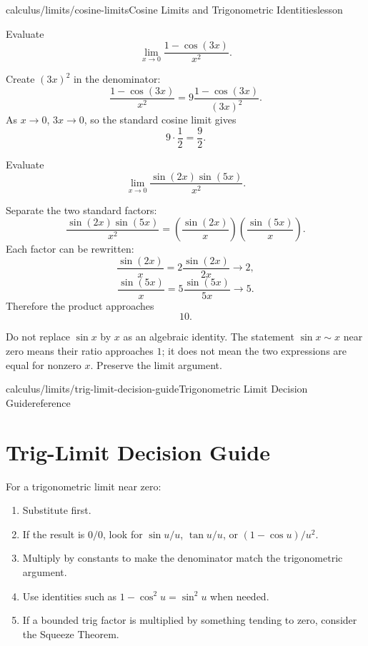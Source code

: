 \begin{webpage}{calculus/limits/cosine-limits}{Cosine Limits and Trigonometric Identities}{lesson}
\begin{bgexample}[title={Identity plus a standard limit}]
Evaluate
\[
  \lim_{x\to0}\frac{1-\cos(3x)}{x^2}.
\]

\begin{bgsolution}
Create \((3x)^2\) in the denominator:
\[
  \frac{1-\cos(3x)}{x^2}
  =9\frac{1-\cos(3x)}{(3x)^2}.
\]
As \(x\to0\), \(3x\to0\), so the standard cosine limit gives
\[
  9\cdot\frac12=\boxed{\frac92}.
\]
\end{bgsolution}
\end{bgexample}

\begin{bgexample}[title={Exam-level: use an identity before the standard limit}]
Evaluate
\[
  \lim_{x\to0}\frac{\sin(2x)\sin(5x)}{x^2}.
\]

\begin{bgsolution}
Separate the two standard factors:
\[
\frac{\sin(2x)\sin(5x)}{x^2}
=\left(\frac{\sin(2x)}{x}\right)
 \left(\frac{\sin(5x)}{x}\right).
\]
Each factor can be rewritten:
\[
  \frac{\sin(2x)}{x}=2\frac{\sin(2x)}{2x}\to2,
\]
\[
  \frac{\sin(5x)}{x}=5\frac{\sin(5x)}{5x}\to5.
\]
Therefore the product approaches
\[
  \boxed{10}.
\]
\end{bgsolution}
\end{bgexample}

\begin{bgexamnote}
Do not replace \(\sin x\) by \(x\) as an algebraic identity. The statement \(\sin x\sim x\) near zero means their ratio approaches \(1\); it does not mean the two expressions are equal for nonzero \(x\). Preserve the limit argument.
\end{bgexamnote}
\end{webpage}

\begin{webpage}{calculus/limits/trig-limit-decision-guide}{Trigonometric Limit Decision Guide}{reference}
\section{Trig-Limit Decision Guide}

\begin{bgmethod}
For a trigonometric limit near zero:
\begin{enumerate}
  \item Substitute first.
  \item If the result is \(0/0\), look for \(\sin u/u\), \(\tan u/u\), or \((1-\cos u)/u^2\).
  \item Multiply by constants to make the denominator match the trigonometric argument.
  \item Use identities such as \(1-\cos^2u=\sin^2u\) when needed.
  \item If a bounded trig factor is multiplied by something tending to zero, consider the Squeeze Theorem.
\end{enumerate}
\end{bgmethod}
\end{webpage}

